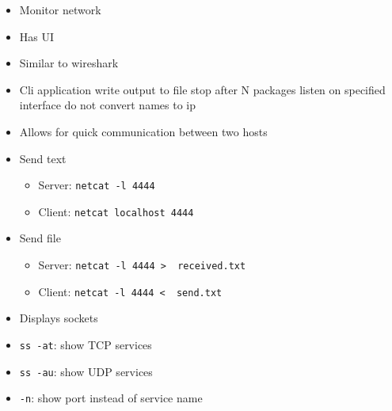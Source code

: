 \begin{itemize}
        \begin{itemize}
            \item Monitor network
            \item Has UI
        \end{itemize}
        \begin{itemize}
            \item Similar to wireshark
            \item Cli application
             write output to file
             stop after N packages
             listen on specified interface
             do not convert names to ip
        \end{itemize}
        \begin{itemize}
            \item Allows for quick communication between two hosts
            \item Send text
                \begin{itemize}
                    \item Server: \verb+netcat -l 4444+
                    \item Client: \verb+netcat localhost 4444+
                \end{itemize}
            \item Send file
                \begin{itemize}
                    \item Server: \verb+netcat -l 4444 >  received.txt+
                    \item Client: \verb+netcat -l 4444 <  send.txt+
                \end{itemize}
        \end{itemize}
        \begin{itemize}
            \item Displays sockets
            \item \verb+ss -at+: show TCP services
            \item \verb+ss -au+: show UDP services
            \item \verb+-n+: show port instead of service name
        \end{itemize}
\end{itemize}

